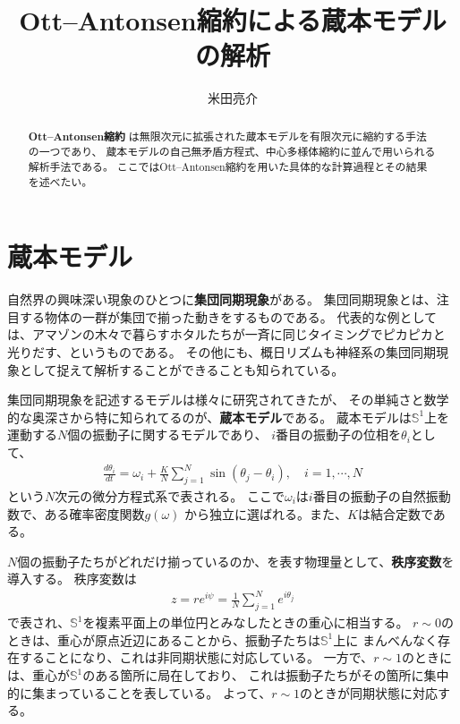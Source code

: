 \documentclass{jsarticle}
\begin{document}
\title{Ott--Antonsen縮約による蔵本モデルの解析}
\author{米田亮介}
\maketitle	

\begin{abstract}
\textbf{Ott--Antonsen縮約}\cite{ott2008low,ott2009long}
は無限次元に拡張された蔵本モデルを有限次元に縮約する手法の一つであり、
蔵本モデルの自己無矛盾方程式、中心多様体縮約に並んで用いられる解析手法である。
ここではOtt--Antonsen縮約を用いた具体的な計算過程とその結果を述べたい。
\end{abstract}

\section{蔵本モデル}
自然界の興味深い現象のひとつに\textbf{集団同期現象}がある。
集団同期現象とは、注目する物体の一群が集団で揃った動きをするものである。
代表的な例としては、アマゾンの木々で暮らすホタルたちが一斉に同じタイミングでピカピカと
光りだす、というものである。
その他にも、概日リズムも神経系の集団同期現象として捉えて解析することができることも知られている。

集団同期現象を記述するモデルは様々に研究されてきたが、
その単純さと数学的な奥深さから特に知られてるのが、\textbf{蔵本モデル}である。
蔵本モデルは$\mathbb{S}^{1}$上を運動する$N$個の振動子に関するモデルであり、
$i$番目の振動子の位相を$\theta_{i}$として、
\begin{align}
\frac{d\theta_{i}}{dt}=\omega_{i}+\frac{K}{N}\sum_{j=1}^{N}\sin(\theta_{j}-\theta_{i}),\quad i=1,\cdots,N
\end{align}
という$N$次元の微分方程式系で表される。
ここで$\omega_{i}$は$i$番目の振動子の自然振動数で、ある確率密度関数$g(\omega)$
から独立に選ばれる。また、$K$は結合定数である。

$N$個の振動子たちがどれだけ揃っているのか、を表す物理量として、\textbf{秩序変数}を導入する。
秩序変数は
\begin{align}
z=re^{i\psi}=\frac{1}{N}\sum_{j=1}^{N}e^{i\theta_{j}}
\end{align}
で表され、$\mathbb{S}^{1}$を複素平面上の単位円とみなしたときの重心に相当する。
$r\sim0$のときは、重心が原点近辺にあることから、振動子たちは$\mathbb{S}^{1}$上に
まんべんなく存在することになり、これは非同期状態に対応している。
一方で、$r\sim1$のときには、重心が$\mathbb{S}^{1}$のある箇所に局在しており、
これは振動子たちがその箇所に集中的に集まっていることを表している。
よって、$r\sim1$のときが同期状態に対応する。
\end{document}
